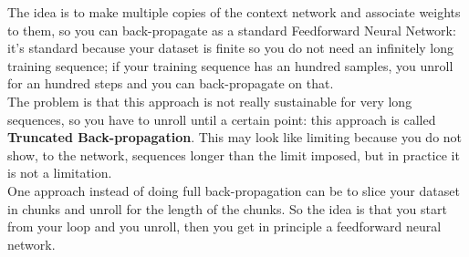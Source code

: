 The idea is to make multiple copies of the context network and associate weights to them, so you can back-propagate as a standard Feedforward Neural Network: it's standard because your dataset is finite so you do not need an infinitely long training sequence; if your training sequence has an hundred samples, you unroll for an hundred steps and you can back-propagate on that. \\
The problem is that this approach is not really sustainable for very long sequences, so you have to unroll until a certain point: this approach is called \textbf{Truncated Back-propagation}. This may look like limiting because you do not show, to the network, sequences longer than the limit imposed, but in practice it is not a limitation. \\ 
One approach instead of doing full back-propagation can be to slice your dataset in chunks and unroll for the length of the chunks. So the idea is that you start from your loop and you unroll, then you get in principle a feedforward neural network. \\ 

